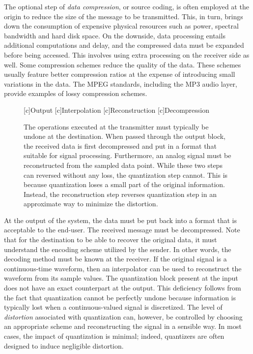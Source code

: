 The optional step of \emph{data compression}, or source coding, is often employed at the origin to reduce the size of the message to be transmitted.
This, in turn, brings down the consumption of expensive physical resources such as power, spectral bandwidth and hard disk space.
On the downside, data processing entails additional computations and delay, and the compressed data must be expanded before being accessed.
This involves using extra processing on the receiver side as well.
Some compression schemes reduce the quality of the data.
These schemes usually feature better compression ratios at the expense of introducing small variations in the data.
The MPEG standards, including the MP3 audio layer, provide examples of lossy compression schemes.

\begin{figure}[htbp]
\begin{center}
\begin{psfrags}
[c]{Output}
[c]{Interpolation}
[c]{Reconstruction}
[c]{Decompression}
\end{psfrags}
\end{center}
\caption{The operations executed at the transmitter must typically be undone at the destination.
When passed through the output block, the received data is first decompressed and put in a format that suitable for signal processing.
Furthermore, an analog signal must be reconstructed from the sampled data point.
While these two steps can reversed without any loss, the quantization step cannot.
This is because quantization loses a small part of the original information.
Instead, the reconstruction step reverses quantization step in an approximate way to minimize the distortion.}
\label{figure:BlockOutput}
\end{figure}

At the output of the system, the data must be put back into a format that is acceptable to the end-user.
The received message must be decompressed.
Note that for the destination to be able to recover the original data, it must understand the encoding scheme utilized by the sender.
In other words, the decoding method must be known at the receiver.
If the original signal is a continuous-time waveform, then an interpolator can be used to reconstruct the waveform from its sample values.
The quantization block present at the input does not have an exact counterpart at the output.
This deficiency follows from the fact that quantization cannot be perfectly undone because information is typically lost when a continuous-valued signal is discretized.
The level of \emph{distortion} associated with quantization can, however, be controlled by choosing an appropriate scheme and reconstructing the signal in a sensible way.
In most cases, the impact of quantization is minimal; indeed, quantizers are often designed to induce negligible distortion.


